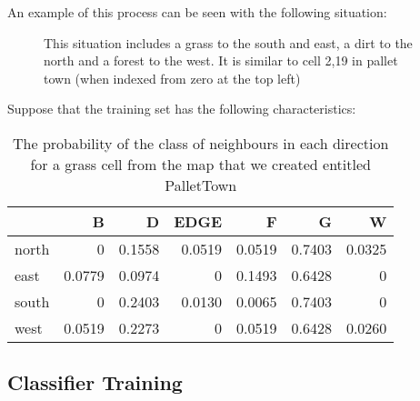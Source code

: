 \documentclass[preprint,5p,times,twocolumn]{elsarticle}
\begin{document}
An example of this process can be seen with the following situation:

\begin{figure}[h]
\begin{center}
\end{center}

\caption{This situation includes a grass to the south and east, a dirt to the
    north and a forest to the west. It is similar to cell 2,19 in pallet town
    (when indexed from zero at the top left)}

\end{figure}

Suppose that the training set has the following characteristics:

\begin{table}[h]
\small
\begin{tabular}{ l | r r r r r r }
              & B      & D      & EDGE   & F      & G      & W \\ \hline
    north     & 0      & 0.1558 & 0.0519 & 0.0519 & 0.7403 & 0.0325\\
    east      & 0.0779 & 0.0974 & 0      & 0.1493 & 0.6428 & 0\\
    south     & 0      & 0.2403 & 0.0130 & 0.0065 & 0.7403 & 0\\
    west      & 0.0519 & 0.2273 & 0      & 0.0519 & 0.6428 & 0.0260\\
\end{tabular}
\caption{The probability of the class of neighbours in each direction for a
    grass cell from the map that we created entitled PalletTown} 
\end{table}


\subsection{Classifier Training}
\label{process:training}
\lipsum[1-2]
\end{document}
